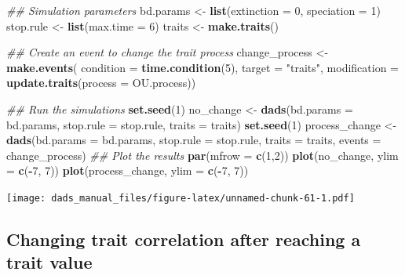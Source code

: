 \documentclass[]{book}
\newenvironment{Shaded}{\begin{snugshade}}{\end{snugshade}}
\newcommand{\CommentTok}[1]{\textcolor[rgb]{0.56,0.35,0.01}{\textit{#1}}}
\newcommand{\DataTypeTok}[1]{\textcolor[rgb]{0.13,0.29,0.53}{#1}}
\newcommand{\DecValTok}[1]{\textcolor[rgb]{0.00,0.00,0.81}{#1}}
\newcommand{\KeywordTok}[1]{\textcolor[rgb]{0.13,0.29,0.53}{\textbf{#1}}}
\newcommand{\NormalTok}[1]{#1}
\newcommand{\OperatorTok}[1]{\textcolor[rgb]{0.81,0.36,0.00}{\textbf{#1}}}
\newcommand{\StringTok}[1]{\textcolor[rgb]{0.31,0.60,0.02}{#1}}
\begin{document}
\begin{Shaded}
\begin{Highlighting}[]
\CommentTok{## Simulation parameters}
\NormalTok{bd.params <-}\StringTok{ }\KeywordTok{list}\NormalTok{(}\DataTypeTok{extinction =} \DecValTok{0}\NormalTok{, }\DataTypeTok{speciation =} \DecValTok{1}\NormalTok{)}
\NormalTok{stop.rule <-}\StringTok{ }\KeywordTok{list}\NormalTok{(}\DataTypeTok{max.time =} \DecValTok{6}\NormalTok{)}
\NormalTok{traits    <-}\StringTok{ }\KeywordTok{make.traits}\NormalTok{()}

\CommentTok{## Create an event to change the trait process}
\NormalTok{change_process <-}\StringTok{ }\KeywordTok{make.events}\NormalTok{(}
                  \DataTypeTok{condition    =} \KeywordTok{time.condition}\NormalTok{(}\DecValTok{5}\NormalTok{),}
                  \DataTypeTok{target       =} \StringTok{"traits"}\NormalTok{,}
                  \DataTypeTok{modification =} \KeywordTok{update.traits}\NormalTok{(}\DataTypeTok{process =}\NormalTok{ OU.process))}

\CommentTok{## Run the simulations}
\KeywordTok{set.seed}\NormalTok{(}\DecValTok{1}\NormalTok{)}
\NormalTok{no_change <-}\StringTok{ }\KeywordTok{dads}\NormalTok{(}\DataTypeTok{bd.params =}\NormalTok{ bd.params,}
                  \DataTypeTok{stop.rule =}\NormalTok{ stop.rule,}
                  \DataTypeTok{traits    =}\NormalTok{ traits)}
\KeywordTok{set.seed}\NormalTok{(}\DecValTok{1}\NormalTok{)}
\NormalTok{process_change <-}\StringTok{ }\KeywordTok{dads}\NormalTok{(}\DataTypeTok{bd.params =}\NormalTok{ bd.params,}
                       \DataTypeTok{stop.rule =}\NormalTok{ stop.rule,}
                       \DataTypeTok{traits    =}\NormalTok{ traits,}
                       \DataTypeTok{events    =}\NormalTok{ change_process)}
\CommentTok{## Plot the results}
\KeywordTok{par}\NormalTok{(}\DataTypeTok{mfrow =} \KeywordTok{c}\NormalTok{(}\DecValTok{1}\NormalTok{,}\DecValTok{2}\NormalTok{))}
\KeywordTok{plot}\NormalTok{(no_change, }\DataTypeTok{ylim =} \KeywordTok{c}\NormalTok{(}\OperatorTok{-}\DecValTok{7}\NormalTok{, }\DecValTok{7}\NormalTok{))}
\KeywordTok{plot}\NormalTok{(process_change, }\DataTypeTok{ylim =} \KeywordTok{c}\NormalTok{(}\OperatorTok{-}\DecValTok{7}\NormalTok{, }\DecValTok{7}\NormalTok{))}
\end{Highlighting}
\end{Shaded}

\texttt{[image: dads\_manual\_files/figure-latex/unnamed-chunk-61-1.pdf]}

\hypertarget{changing-trait-correlation-after-reaching-a-trait-value}{%
\subsection{Changing trait correlation after reaching a trait value}\label{changing-trait-correlation-after-reaching-a-trait-value}}
\end{document}

